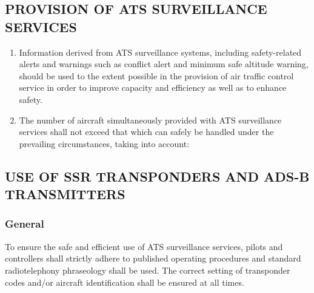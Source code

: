 \documentclass[../main.tex]{subfiles}
\begin{document}
    \subsection[Provision of ATS surveillance services]{PROVISION OF ATS SURVEILLANCE SERVICES}

    \begin{enumerate}[label=\arabic{section}.\arabic{subsection}.\arabic*]
        \item Information derived from ATS surveillance systems, including safety-related alerts and warnings such as conflict alert and minimum safe altitude warning, should be used to the extent possible in the provision of air traffic control service in order to improve capacity and efficiency as well as to enhance safety.
        \item The number of aircraft simultaneously provided with ATS surveillance services shall not exceed that which can safely be handled under the prevailing circumstances, taking into account:

    \end{enumerate}

    \subsection[Use of SSR transponders and ADS-B transmitters]{USE OF SSR TRANSPONDERS AND ADS-B TRANSMITTERS}

    \subsubsection{General}

    To ensure the safe and efficient use of ATS surveillance services, pilots and controllers shall strictly adhere to published operating procedures and standard radiotelephony phraseology shall be used. The correct setting of transponder codes and/or aircraft identification shall be ensured at all times.
\end{document}

